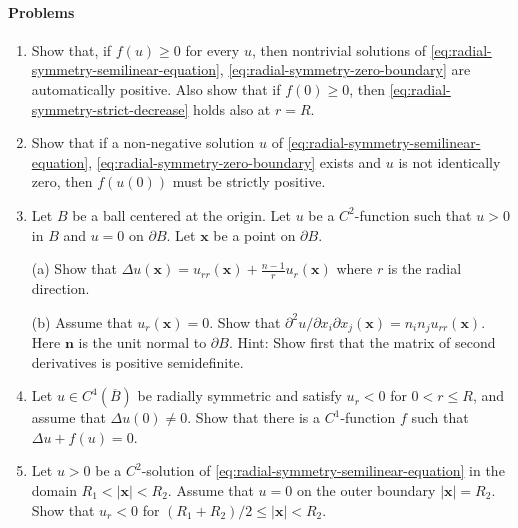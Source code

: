 \paragraph*{Problems}

\begin{enumerate}[label=\thesection.\arabic*.,ref=\thesection.\arabic*,start=17,series=book-problems]

\item\label{ex:nonnegative-nonlinearity-positive-solution} Show that, if $f(u)\geq0$ for every $u$, then nontrivial solutions of \eqref{eq:radial-symmetry-semilinear-equation}, \eqref{eq:radial-symmetry-zero-boundary} are automatically positive. Also show that if $f(0)\geq0$, then \eqref{eq:radial-symmetry-strict-decrease} holds also at $r=R$.

\item\label{ex:radial-center-nonlinearity-positive} Show that if a non-negative solution $u$ of \eqref{eq:radial-symmetry-semilinear-equation}, \eqref{eq:radial-symmetry-zero-boundary} exists and $u$ is not identically zero, then $f(u(0))$ must be strictly positive.

\item\label{ex:boundary-hessian-radial-identity} Let $B$ be a ball centered at the origin. Let $u$ be a $C^2$-function such that $u>0$ in $B$ and $u=0$ on $\partial B$. Let $\bm{x}$ be a point on $\partial B$.

(a) Show that $\Delta u(\bm{x})=u_{rr}(\bm{x})+\frac{n-1}{r}u_r(\bm{x})$ where $r$ is the radial direction.

(b) Assume that $u_r(\bm{x})=0$. Show that $\partial^2u/\partial x_i\partial x_j(\bm{x})=n_in_ju_{rr}(\bm{x})$. Here $\bm{n}$ is the unit normal to $\partial B$. Hint: Show first that the matrix of second derivatives is positive semidefinite.

\item\label{ex:radial-profile-semilinear-construction} Let $u\in C^4(\overline B)$ be radially symmetric and satisfy $u_r<0$ for $0<r\leq R$, and assume that $\Delta u(0)\ne0$. Show that there is a $C^1$-function $f$ such that $\Delta u+f(u)=0$.

\item\label{ex:annular-positive-solution-outward-monotonicity} Let $u>0$ be a $C^2$-solution of \eqref{eq:radial-symmetry-semilinear-equation} in the domain $R_1<|\bm{x}|<R_2$. Assume that $u=0$ on the outer boundary $|\bm{x}|=R_2$. Show that $u_r<0$ for $(R_1+R_2)/2\leq|\bm{x}|<R_2$.

\end{enumerate}
